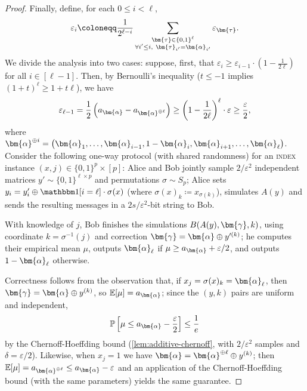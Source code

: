 \documentclass[10pt,a4paper]{article}
\theoremstyle{definition}
\newcommand{\E}{\mathbb E}
\renewcommand{\P}{\mathbb P}
\newcommand{\eps}{\varepsilon}
\newcommand{\bitset}{\{0,1\}}
\newcommand{\indexproblem}{\normalfont\textsc{index}\xspace}
\newcommand{\pcommitlength}{p}
\newcommand{\pcommitstring}{y}
\newcommand{\chf}{\mathbbm 1}
\def\fe#1{
    \ifnum#1=1
        \alpha
    \else
    \ifnum#1=2
        \beta
    \else
    \ifnum#1=3
        \gamma
    \fi\fi\fi
}
\begin{document}
\begin{proof}
    Finally, define, for each $0 \leq i < \ell$,
    \begin{equation*}
        \eps_i \coloneqq \frac1{2^{\ell - i}} \sum_{\substack{\bm{\tau} \in \bitset^{\ell} \\ \forall i' \leq i, ~ \bm{\tau}_{i'} = \bm{\fe1}_{i'}}} \eps_{\bm{\tau}}.
    \end{equation*}
    We divide the analysis into two cases: suppose, first, that $\eps_i \geq \eps_{i - 1} \cdot \left(1 - \frac1{2\ell}\right)$ for all $i \in [\ell - 1]$. Then, by Bernoulli's inequality ($t \leq -1$ implies $(1 + t)^{\ell} \geq 1 + t\ell$), we have
    \begin{equation*}
        \eps_{\ell - 1} = \frac12 \left(a_{\bm{\fe1}} - a_{\bm{\fe1}^{\oplus \ell}}\right) \geq \left(1 - \frac1{2\ell}\right)^{\ell} \cdot \eps \geq \frac{\eps}{2},
    \end{equation*}
    where $\bm{\fe1}^{\oplus i} = \left(\bm{\fe1}_1, \ldots, \bm{\fe1}_{i - 1}, 1 - \bm{\fe1}_i, \bm{\fe1}_{i + 1}, \ldots, \bm{\fe1}_\ell\right)$. Consider the following one-way protocol (with shared randomness) for an \indexproblem instance $(x, j) \in \bitset^\pcommitlength \times [\pcommitlength]$: Alice and Bob jointly sample $2/\eps^2$ independent matrices $\pcommitstring' \sim \bitset^{\ell \times \pcommitlength}$ and permutations $\sigma \sim S_\pcommitlength$; Alice sets $\pcommitstring_i = \pcommitstring'_i \oplus \chf[i = \ell] \cdot \sigma(x)$ (where $\sigma(x)_k \coloneqq x_{\sigma(k)}$), simulates $A(\pcommitstring)$ and sends the resulting messages in a $2s/\eps^2$-bit string to Bob.
    
    With knowledge of $j$, Bob finishes the simulations $B(A(\pcommitstring), \bm{\fe3}, k)$, using coordinate $k = \sigma^{-1}(j)$ and correction $\bm{\fe3} = \bm{\fe1} \oplus \pcommitstring'^{(k)}$; he computes their empirical mean $\mu$, outputs $\bm{\fe1}_\ell$ if $\mu \geq a_{\bm{\fe1}} + \eps/2$, and outputs $1 - \bm{\fe1}_\ell$ otherwise.
    
    Correctness follows from the observation that, if $x_j = \sigma(x)_k = \bm{\fe1}_\ell$, then $\bm{\fe3} = \bm{\fe1} \oplus \pcommitstring^{(k)}$, so $\E[\mu] = a_{\bm{\fe1}}$; since the $(\pcommitstring, k)$ pairs are uniform and independent,
    \begin{equation*}
        \P\left[\mu \leq a_{\bm{\fe1}} - \frac{\eps}{2}\right] \leq \frac1 e
    \end{equation*}
    by the Chernoff-Hoeffding bound (\cref{lem:additive-chernoff}, with $2/\eps^2$ samples and $\delta = \eps/2$). Likewise, when $x_j = 1$ we have $\bm{\fe1} = \bm{\fe1}^{\oplus \ell} \oplus \pcommitstring^{(k)}$; then $\E[\mu] = a_{\bm{\fe1}^{\oplus \ell}} \leq a_{\bm{\fe1}} - \eps$ and an application of the Chernoff-Hoeffding bound (with the same parameters) yields the same guarantee.
    

\end{proof}
\end{document}
